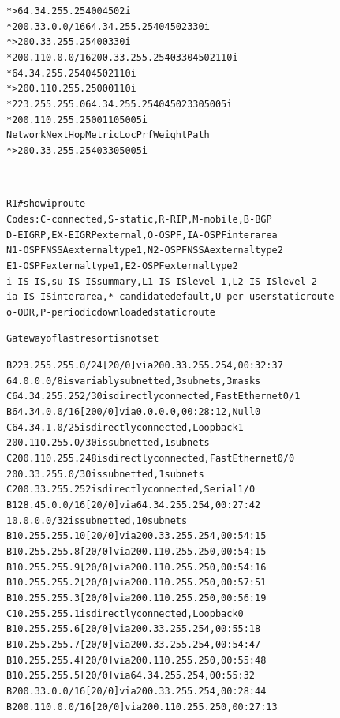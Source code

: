 \documentclass[12pt,twoside,a4paper]{report}
\begin{document}
{\begin{small}
\begin{alltt}
*>                  64.34.255.254            0             0 4502 i
*  200.33.0.0/16    64.34.255.254                          0 4502 330 i
*>                  200.33.255.254           0             0 330 i
*  200.110.0.0/16   200.33.255.254                         0 330 4502 110 i
*                   64.34.255.254                          0 4502 110 i
*>                  200.110.255.250          0             0 110 i
*  223.255.255.0    64.34.255.254                          0 4502 330 5005 i
*                   200.110.255.250                        0 110 5005 i
   Network          Next Hop            Metric LocPrf Weight Path
*>                  200.33.255.254                         0 330 5005 i


-------------------------------------------------------------------------------------


R1#show ip route
Codes: C - connected, S - static, R - RIP, M - mobile, B - BGP
       D - EIGRP, EX - EIGRP external, O - OSPF, IA - OSPF inter area 
       N1 - OSPF NSSA external type 1, N2 - OSPF NSSA external type 2
       E1 - OSPF external type 1, E2 - OSPF external type 2
       i - IS-IS, su - IS-IS summary, L1 - IS-IS level-1, L2 - IS-IS level-2
       ia - IS-IS inter area, * - candidate default, U - per-user static route
       o - ODR, P - periodic downloaded static route

Gateway of last resort is not set

B    223.255.255.0/24 [20/0] via 200.33.255.254, 00:32:37
     64.0.0.0/8 is variably subnetted, 3 subnets, 3 masks
C       64.34.255.252/30 is directly connected, FastEthernet0/1
B       64.34.0.0/16 [200/0] via 0.0.0.0, 00:28:12, Null0
C       64.34.1.0/25 is directly connected, Loopback1
     200.110.255.0/30 is subnetted, 1 subnets
C       200.110.255.248 is directly connected, FastEthernet0/0
     200.33.255.0/30 is subnetted, 1 subnets
C       200.33.255.252 is directly connected, Serial1/0
B    128.45.0.0/16 [20/0] via 64.34.255.254, 00:27:42
     10.0.0.0/32 is subnetted, 10 subnets
B       10.255.255.10 [20/0] via 200.33.255.254, 00:54:15
B       10.255.255.8 [20/0] via 200.110.255.250, 00:54:15
B       10.255.255.9 [20/0] via 200.110.255.250, 00:54:16
B       10.255.255.2 [20/0] via 200.110.255.250, 00:57:51
B       10.255.255.3 [20/0] via 200.110.255.250, 00:56:19
C       10.255.255.1 is directly connected, Loopback0
B       10.255.255.6 [20/0] via 200.33.255.254, 00:55:18
B       10.255.255.7 [20/0] via 200.33.255.254, 00:54:47
B       10.255.255.4 [20/0] via 200.110.255.250, 00:55:48
B       10.255.255.5 [20/0] via 64.34.255.254, 00:55:32
B    200.33.0.0/16 [20/0] via 200.33.255.254, 00:28:44
B    200.110.0.0/16 [20/0] via 200.110.255.250, 00:27:13
\end{alltt}
\end{small}
}
\end{document}
